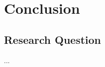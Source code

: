 \chapter{Conclusion}
\label{concl}

\minitoc


\newpage

\section{Research Question}

\begin{fancyquotes}
...
\end{fancyquotes}
